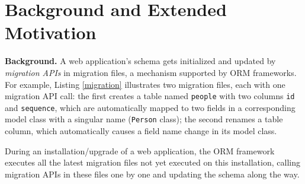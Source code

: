 \section{Background and Extended Motivation}
\label{sec:back}

\textbf{Background.} 
A web application's schema gets initialized and 
updated by \textit{migration APIs} in migration 
files, a mechanism supported by ORM frameworks. 
For example, Listing \ref{migration} illustrates
two migration files, each with one migration API
call: the first creates a table named \texttt{people} with two columns \texttt{id} and \texttt{sequence},
which are automatically mapped to two fields in a corresponding model class
with a singular name
(\texttt{Person} class); the second 
renames a table column, which automatically causes
a field name change in its model class. 

During an installation/upgrade of a 
web application, the ORM framework executes all the
latest migration files not yet executed
on this installation, calling migration APIs in these files one by one and updating the schema along the way.

%
